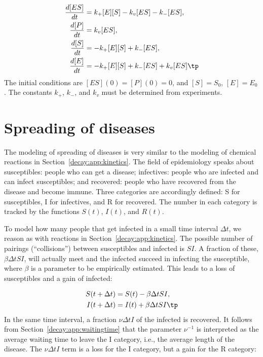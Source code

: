 \documentclass[graybox,sectrefs,envcountresetchap,open=right,final]{svmonodo}
\begin{document}
\begin{align}
\frac{d[ES]}{dt} &= k_+[E][S] - k_v[ES] - k_-[ES],
\label{decay:app:MMK:ES1}\\ 
\frac{d[P]}{dt} &= k_v[ES],
\label{decay:app:MMK:P1}\\ 
\frac{d[S]}{dt} &= -k_+[E][S] + k_-[ES],
\label{decay:app:MMK:S1}\\ 
\frac{d[E]}{dt} &= -k_+[E][S] + k_-[ES] + k_v[ES]\tp
\label{decay:app:MMK:E1}
\end{align}
The initial conditions are $[ES](0)=[P](0)=0$, and $[S]=S_0$, $[E]=E_0$.
The constants $k_+$, $k_-$, and $k_v$ must be determined from experiments.



\section{Spreading of diseases}
\label{decay:app:SIR}

The modeling of spreading of diseases is very similar to the modeling
of chemical reactions in Section~\ref{decay:app:kinetics}. The field
of epidemiology speaks about susceptibles: people who can get a disease;
infectives: people who are infected and can infect susceptibles; and
recovered: people who have recovered from the disease and
become immune.
Three categories are accordingly defined: S for susceptibles, I for
infectives, and R for recovered. The number in each category is tracked
by the functions $S(t)$, $I(t)$, and $R(t)$.

To model how many people that get infected in a small time interval
$\Delta t$, we reason as with reactions in Section~\ref{decay:app:kinetics}.
The possible number of pairings (``collisions'') between susceptibles
and infected is $SI$. A fraction of these, $\beta\Delta t SI$,
will actually meet and the infected succeed in infecting the susceptible,
where $\beta$ is a parameter to be empirically estimated.
This leads to a loss of susceptibles and a gain of infected:

\begin{align*}
S(t+\Delta t) &= S(t) - \beta\Delta tSI,\\ 
I(t+\Delta t) &= I(t) + \beta\Delta tSI\tp
\end{align*}
In the same time interval, a fraction $\nu\Delta t I$
of the infected is recovered.
It follows from Section~\ref{decay:app:waitingtime}
that the parameter $\nu^{-1}$ is interpreted as the average
waiting time to leave the I category, i.e., the
average length of the disease.
The $\nu \Delta tI$ term is a loss for the I category, but a gain for the R
category:
\end{document}
